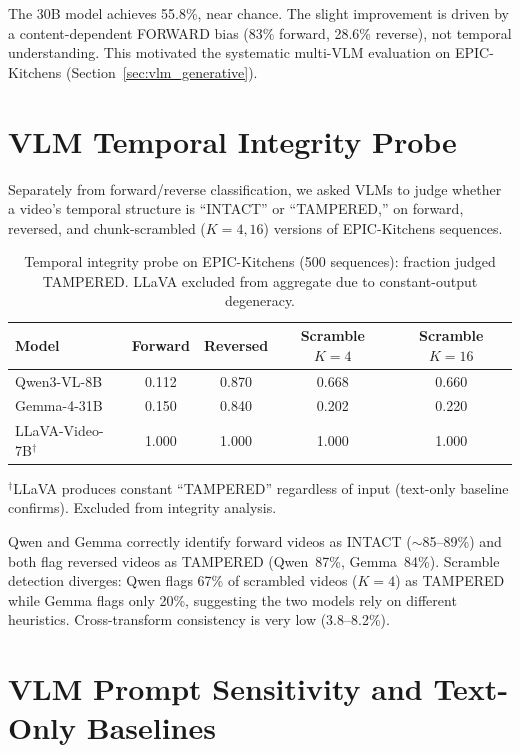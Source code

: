 \documentclass{article}
\theoremstyle{remark}
\begin{document}
The 30B model achieves 55.8\%, near chance. The slight improvement is driven by a content-dependent FORWARD bias (83\% forward, 28.6\% reverse), not temporal understanding. This motivated the systematic multi-VLM evaluation on EPIC-Kitchens (Section~\ref{sec:vlm_generative}).

\section{VLM Temporal Integrity Probe}
\label{sec:integrity_probe}

Separately from forward/reverse classification, we asked VLMs to judge whether a video's temporal structure is ``INTACT'' or ``TAMPERED,'' on forward, reversed, and chunk-scrambled ($K\!=\!4, 16$) versions of EPIC-Kitchens sequences.

\begin{table}[h]
\centering
\caption{Temporal integrity probe on EPIC-Kitchens (500 sequences): fraction judged TAMPERED. LLaVA excluded from aggregate due to constant-output degeneracy.}
\label{tab:integrity_probe}
\begin{tabular}{lcccc}
\toprule
\textbf{Model} & \textbf{Forward} & \textbf{Reversed} & \textbf{Scramble $K\!=\!4$} & \textbf{Scramble $K\!=\!16$} \\
\midrule
Qwen3-VL-8B & 0.112 & 0.870 & 0.668 & 0.660 \\
Gemma-4-31B & 0.150 & 0.840 & 0.202 & 0.220 \\
LLaVA-Video-7B$^\dagger$ & 1.000 & 1.000 & 1.000 & 1.000 \\
\bottomrule
\end{tabular}
\begin{flushleft}
\small $^\dagger$LLaVA produces constant ``TAMPERED'' regardless of input (text-only baseline confirms). Excluded from integrity analysis.
\end{flushleft}
\end{table}

Qwen and Gemma correctly identify forward videos as INTACT ($\sim$85--89\%) and both flag reversed videos as TAMPERED (Qwen~87\%, Gemma~84\%). Scramble detection diverges: Qwen flags 67\% of scrambled videos ($K\!=\!4$) as TAMPERED while Gemma flags only 20\%, suggesting the two models rely on different heuristics. Cross-transform consistency is very low (3.8--8.2\%).

\section{VLM Prompt Sensitivity and Text-Only Baselines}
\label{sec:prompt_details}
\end{document}
